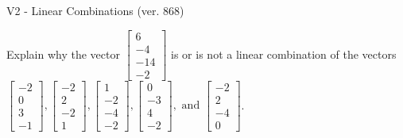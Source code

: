 \begin{exercise}
  \begin{exerciseTitle}V2 - Linear Combinations (ver. 868)\end{exerciseTitle}
  \begin{exerciseStatement}
    Explain why the vector \(\left[\begin{array}{c}
6 \\
-4 \\
-14 \\
-2
\end{array}\right]\)  is or is not a linear 
	combination of the vectors \(\left[\begin{array}{c}
-2 \\
0 \\
3 \\
-1
\end{array}\right] , \left[\begin{array}{c}
-2 \\
2 \\
-2 \\
1
\end{array}\right] , \left[\begin{array}{c}
1 \\
-2 \\
-4 \\
-2
\end{array}\right] , \left[\begin{array}{c}
0 \\
-3 \\
4 \\
-2
\end{array}\right] , \text{ and } \left[\begin{array}{c}
-2 \\
2 \\
-4 \\
0
\end{array}\right]\).
	



\end{exerciseStatement}
\end{exercise}
